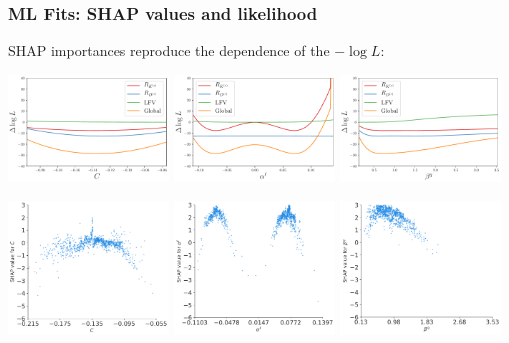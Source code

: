 \documentclass[mathserif, 10pt]{beamer}
\begin{document}
\begin{frame}\frametitle{ML Fits: SHAP values and likelihood}
    SHAP importances reproduce the dependence of the $-\log L$:
    \begin{center}
        \includegraphics[width=0.32\textwidth]{figures/evoplot_C.pdf}
        \includegraphics[width=0.32\textwidth]{figures/evoplot_alphal.pdf}
        \includegraphics[width=0.32\textwidth]{figures/evoplot_betaq.pdf}
    \end{center}
    \begin{center}
        \includegraphics[width=0.32\textwidth]{figures/SHAP_C.pdf}
        \includegraphics[width=0.32\textwidth]{figures/SHAP_al.pdf}
        \includegraphics[width=0.32\textwidth]{figures/SHAP_bq.pdf}
    \end{center}


\end{frame}
\end{document}
